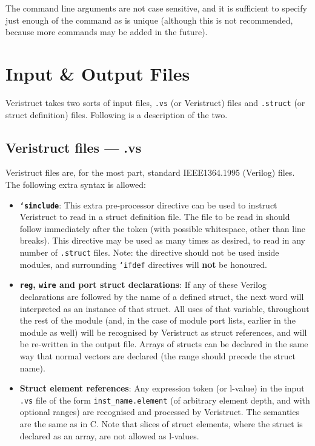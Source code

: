\documentclass[a4paper]{article} \usepackage[dvips]{graphicx}
\begin{document}
The command line arguments are not case sensitive, and it is
sufficient to specify just enough of the command as is unique
(although this is not recommended, because more commands may be added
in the future).

\section{Input \& Output Files}
\label{sec:files}
Veristruct takes two sorts of input files, \texttt{.vs} (or
Veristruct) files and \texttt{.struct} (or struct definition)
files. Following is a description of the two.

\subsection{Veristruct files --- .vs}
\label{sec:vs_files}
Veristruct files are, for the most part, standard IEEE1364.1995
(Verilog) files.  The following extra syntax is allowed:

\begin{itemize}
\item \textbf{\texttt{`sinclude}}: This extra pre-processor directive
  can be used to instruct Veristruct to read in a struct definition
  file. The file to be read in should follow immediately after the
  token (with possible whitespace, other than line breaks). This
  directive may be used as many times as desired, to read in any
  number of \texttt{.struct} files. Note: the directive should not be
  used inside modules, and surrounding \texttt{`ifdef} directives will
  \textbf{not} be honoured.
\item \textbf{\texttt{reg}, \texttt{wire} and port struct
    declarations}: If any of these Verilog declarations are followed
  by the name of a defined struct, the next word will interpreted as
  an instance of that struct. All uses of that variable, throughout
  the rest of the module (and, in the case of module port lists,
  earlier in the module as well) will be recognised by Veristruct as
  struct references, and will be re-written in the output file. Arrays
  of structs can be declared in the same way that normal vectors are
  declared (the range should precede the struct name).
\item \textbf{Struct element references}: Any expression token (or
  l-value) in the input \texttt{.vs} file of the form
  \texttt{inst\_name.element} (of arbitrary element depth, and with
  optional ranges) are recognised and processed by Veristruct. The
  semantics are the same as in C. Note that slices of struct elements,
  where the struct is declared as an array, are not allowed as
  l-values.
\end{itemize}
\end{document}
